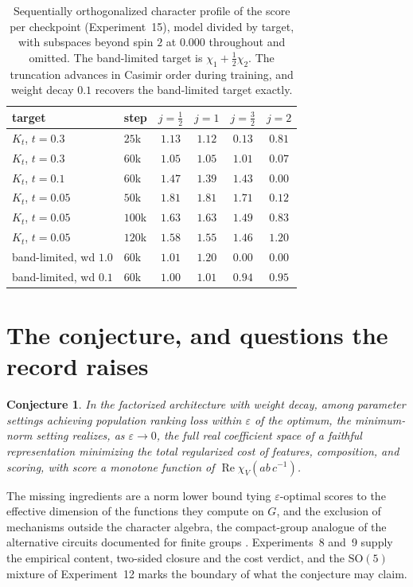 \documentclass{article}
\newtheorem{conjecture}{Conjecture}
\newcommand{\SO}{\mathrm{SO}}
\begin{document}
\begin{table}[t]
\centering
\caption{Sequentially orthogonalized character profile of the score per
checkpoint (Experiment~15), model divided by target, with subspaces beyond spin $2$ at $0.000$
throughout and omitted. The band-limited target is
$\chi_1 + \tfrac12\chi_2$. The truncation advances in Casimir order
during training, and weight decay $0.1$ recovers the band-limited
target exactly.}
\label{tab:recovery}
\scriptsize
\begin{tabular}{llcccc}
\toprule
target & step & $j = \tfrac12$ & $j = 1$ & $j = \tfrac32$ & $j = 2$ \\
\midrule
$K_t$, $t = 0.3$ & $25$k & $1.13$ & $1.12$ & $0.13$ & $0.81$ \\
$K_t$, $t = 0.3$ & $60$k & $1.05$ & $1.05$ & $1.01$ & $0.07$ \\
$K_t$, $t = 0.1$ & $60$k & $1.47$ & $1.39$ & $1.43$ & $0.00$ \\
$K_t$, $t = 0.05$ & $50$k & $1.81$ & $1.81$ & $1.71$ & $0.12$ \\
$K_t$, $t = 0.05$ & $100$k & $1.63$ & $1.63$ & $1.49$ & $0.83$ \\
$K_t$, $t = 0.05$ & $120$k & $1.58$ & $1.55$ & $1.46$ & $1.20$ \\
band-limited, wd $1.0$ & $60$k & $1.01$ & $1.20$ & $0.00$ & $0.00$ \\
band-limited, wd $0.1$ & $60$k & $1.00$ & $1.01$ & $0.94$ & $0.95$ \\
\bottomrule
\end{tabular}
\end{table}

\section{The conjecture, and questions the record raises}
\label{app:questions}

\begin{conjecture}
\label{conj:selection}
In the factorized architecture with weight decay, among parameter
settings achieving population ranking loss within $\varepsilon$ of the
optimum, the minimum-norm setting realizes, as $\varepsilon \to 0$, the
full real coefficient space of a faithful representation minimizing the
total regularized cost of features, composition, and scoring, with
score a monotone function of $\operatorname{Re}\chi_V(ab\,c^{-1})$.
\end{conjecture}

The missing ingredients are a norm lower bound tying
$\varepsilon$-optimal scores to the effective dimension of the
functions they compute on $G$, and the exclusion of mechanisms outside
the character algebra, the compact-group analogue of the alternative
circuits documented for finite groups \cite{stander2024, zhong2023}.
Experiments~8 and~9 supply the empirical content, two-sided closure
and the cost verdict, and the $\SO(5)$ mixture of Experiment~12 marks
the boundary of what the conjecture may claim.
\end{document}
